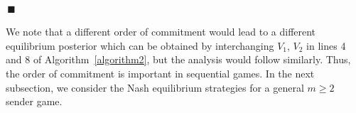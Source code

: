 \documentclass[12pt,journal,onecolumn]{IEEEtran}
\newenvironment{Proof}[1]{\medskip\par\noindent{\bf Proof:\,}\,#1}{{\mbox{\,$\blacksquare$}\par}}
\newcommand{\rknote}[1]{\noindent{\leavevmode\color{red}[Raj -- #1]}}
\begin{document}
\begin{Proof}
\end{Proof}
We note that a different order of commitment would lead to a different equilibrium posterior which can be obtained by interchanging $V_1$, $V_2$ in lines 4 and 8 of Algorithm~\ref{algorithm2}, but the analysis would follow similarly. Thus, the order of commitment is important in sequential games. In the next subsection, we consider the Nash equilibrium strategies for a general $m\geq 2$ sender game. 
\end{document}
